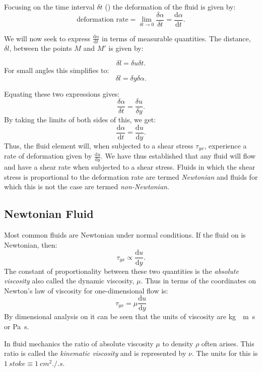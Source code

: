 Focusing on the time interval $\delta t$ () the deformation of the fluid is given by:
\[ 
\text{deformation rate} = \lim_{\delta t \to 0} \frac{\delta \alpha}{\delta t} = \frac{\mathrm{d} \alpha}{\mathrm{d}t} 
.\]

We will now seek to express $\frac{\mathrm{d}\alpha}{\mathrm{d}t} $ in terms of measurable quantities. The distance, $\delta l$, between the points $M$ and $M'$ is given by:

\[ 
\delta l = \delta u \delta t
.\]
For small angles this simplifies to:
\[ 
\delta l = \delta y \delta \alpha
.\]

Equating these two expressions gives:
\[ 
\frac{\delta \alpha}{\delta t} = \frac{\delta u}{\delta y}
.\]
By taking the limits of both sides of this, we get:
\[ 
\frac{\mathrm{d}\alpha}{\mathrm{d}t} = \frac{\mathrm{d}u}{\mathrm{d}y} 
.\]
Thus, the fluid element will, when subjected to a shear stress $\tau_{yx}$, experience a rate of deformation given by $\frac{\mathrm{d}u}{\mathrm{d}y} $. We have thus established that any fluid will flow and have a shear rate when subjected to a shear stress. Fluids in which the shear stress is proportional to the deformation rate are termed \textit{Newtonian} and fluids for which this is not the case are termed \textit{non-Newtonian}.

\subsection{Newtonian Fluid}
Most common fluids are Newtonian under normal conditions. If the fluid on  is Newtonian, then:
\[ 
\tau_{yx} \propto \frac{\mathrm{d}u}{\mathrm{d}y} 
.\]
The constant of proportionality between these two quantities is the \textit{absolute viscosity} also called the dynamic viscosity, $\mu$. Thus in terms of the coordinates on  Newton's law of viscosity for one-dimensional flow is:
\begin{equation} \label{eq:newvisone}
  \tau_{yx} = \mu \frac{\mathrm{d}u}{\mathrm{d}y} 
\end{equation}
By dimensional analysis on  it can be seen that the units of viscosity are \unit{kg.\per.m.s} or \unit{Pa.s}.

In fluid mechanics the ratio of absolute viscosity $\mu$ to density $\rho$ often arises. This ratio is called the \textit{kinematic viscosity} and is represented by $\nu$. The units for this is $\qty{1}{stoke} \equiv \qty{1}{cm^2.\per.s}$.

